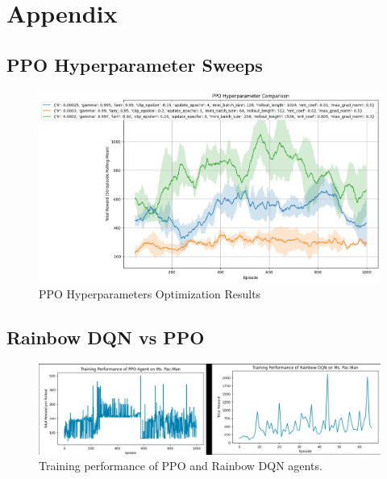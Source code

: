 \documentclass{article}
\begin{document}
\appendix
\section{Appendix}
\label{sec:appendix}

\subsection{PPO Hyperparameter Sweeps}
\begin{figure}[htbp]
  \centering
  \includegraphics[width=\linewidth]{PPO_output_hyperparameters_3set.png}
  \caption{PPO Hyperparameters Optimization Results}
  \label{fig:ppo_hyperparams}
\end{figure}

\subsection{Rainbow DQN vs PPO}
\begin{figure}[htbp]
  \centering
  \includegraphics[width=0.85\linewidth]{rainbow_vs_ppo.png}
  \caption{Training performance of PPO and Rainbow DQN agents.}
  \label{fig:ppo_vs_rainbow}
\end{figure}
\end{document}
